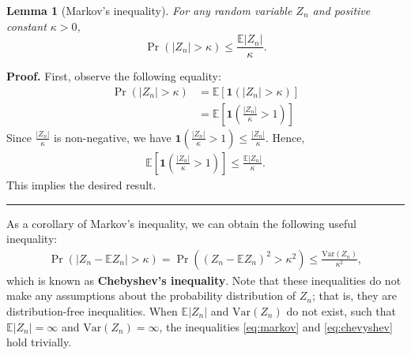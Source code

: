 \documentclass[10.5pt, A4paper, openany, uplatex]{book}
\newcommand{\mbf}{\mathbf}
\newcommand{\E}{\mathbb{E}}
\newcommand{\Var}{\mathrm{Var}}
\newtheorem{lemma}[theorem]{Lemma}
\newenvironment{proof}[1][Proof]{\textbf{#1.} }{\  \rule{0.5em}{0.5em}}
\numberwithin{equation}{section}
\begin{document}
\begin{lemma}[Markov's inequality]\label{markov}
	For any random variable $Z_n$ and positive constant $\kappa > 0$,
	\begin{equation}\label{eq:markov}
	\Pr\left( |Z_n| > \kappa \right) \leq \frac{\E|Z_n|}{\kappa}.
	\end{equation}
\end{lemma}

\begin{proof}
	First, observe the following equality:
	\begin{align*}
	\Pr( |Z_n| > \kappa ) 
	& = \E[\mbf{1}(|Z_n| > \kappa )] \\
	& = \E\left[\mbf{1}\left(\frac{|Z_n|}{\kappa} > 1 \right)\right]
	\end{align*}
	Since $\frac{|Z_n|}{\kappa}$ is non-negative, we have $\mbf{1}\left(\frac{|Z_n|}{\kappa} > 1 \right) \le \frac{|Z_n|}{\kappa}$.
	Hence,
	\begin{align*}
	\E\left[\mbf{1}\left(\frac{|Z_n|}{\kappa} > 1 \right)\right] \le \frac{\E|Z_n|}{\kappa}.
	\end{align*}
	This implies the desired result.
\end{proof}

As a corollary of Markov's inequality, we can obtain the following useful inequality:
\begin{align}\label{eq:chevyshev}
\Pr( |Z_n - \E Z_n | > \kappa ) = \Pr( (Z_n - \E Z_n)^2 > \kappa^2 ) \leq \frac{\Var(Z_n)}{\kappa^2},
\end{align}
which is known as \textbf{Chebyshev's inequality}.
Note that these inequalities do not make any assumptions about the probability distribution of $Z_n$; that is, they are distribution-free inequalities.
When $\E |Z_n|$ and $\Var(Z_n)$ do not exist, such that $\E |Z_n| = \infty$ and $\Var(Z_n) = \infty$, the inequalities  \eqref{eq:markov} and \eqref{eq:chevyshev} hold trivially.
\bigskip
\end{document}
